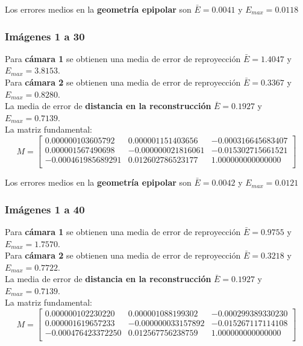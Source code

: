 \documentclass[a4paper, fontsize=11pt]{scrartcl} %
\numberwithin{equation}{section} %
\numberwithin{figure}{section} %
\numberwithin{table}{section} %
\begin{document}
	Los errores medios en la \textbf{geometría epipolar} son $\bar{E} = 0.0041$ y $E_{max} = 0.0118$
	
	\subsubsection*{Imágenes 1 a 30}
	
	Para \textbf{cámara 1} se obtienen una media de error de reproyección $\bar{E} = 1.4047$ y $E_{max} = 3.8153$.\\
	Para \textbf{cámara 2} se obtienen una media de error de reproyección $\bar{E} = 0.3367$ y $E_{max} = 0.8280$.\\
	
	La media de error de \textbf{distancia en la reconstrucción} $\bar{E} = 0.1927$ y $E_{max} = 0.7139$.\\
	La matriz fundamental:
	\[
	M=
	\begin{bmatrix}
	0.000000103605792&	0.000001151403656&	-0.000316645683407 \\
	0.000001567490698&	-0.000000021816061&	-0.015302715661521 \\
	-0.000461985689291&	0.012602786523177&	1.000000000000000  \\
	
	\end{bmatrix}
	\]
	
	Los errores medios en la \textbf{geometría epipolar} son $\bar{E} =  0.0042$ y $E_{max} = 0.0121$
	
	\subsubsection*{Imágenes 1 a 40}
	
	Para \textbf{cámara 1} se obtienen una media de error de reproyección $\bar{E} = 0.9755$ y $E_{max} = 1.7570$.\\
	Para \textbf{cámara 2} se obtienen una media de error de reproyección $\bar{E} = 0.3218$ y $E_{max} = 0.7722$.\\
	
	La media de error de \textbf{distancia en la reconstrucción} $\bar{E} = 0.1927$ y $E_{max} = 0.7139$.\\
	La matriz fundamental:
	\[
	M=
	\begin{bmatrix}
	0.000000102230220&	0.000001088199302&	-0.000299389330230 \\
	0.000001619657233&	-0.000000033157892&	-0.015267117114108 \\
	-0.000476423372250&	0.012567756238759&	1.000000000000000  \\
	
	\end{bmatrix}
	\]
	
\end{document}
